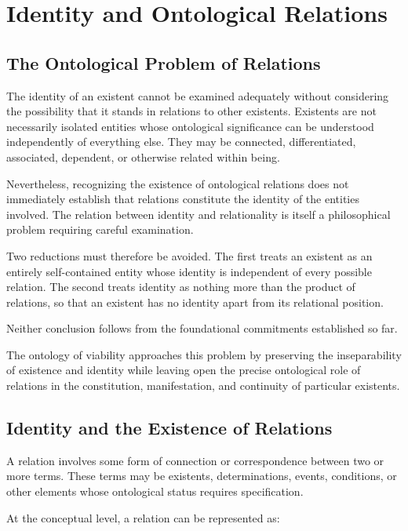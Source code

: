 
\section{Identity and Ontological Relations}
\label{sec:identity-and-ontological-relations}

\subsection{The Ontological Problem of Relations}

The identity of an existent cannot be examined adequately without considering the possibility that it stands in relations to other existents. Existents are not necessarily isolated entities whose ontological significance can be understood independently of everything else. They may be connected, differentiated, associated, dependent, or otherwise related within being.

Nevertheless, recognizing the existence of ontological relations does not immediately establish that relations constitute the identity of the entities involved. The relation between identity and relationality is itself a philosophical problem requiring careful examination.

Two reductions must therefore be avoided. The first treats an existent as an entirely self-contained entity whose identity is independent of every possible relation. The second treats identity as nothing more than the product of relations, so that an existent has no identity apart from its relational position.

Neither conclusion follows from the foundational commitments established so far.

The ontology of viability approaches this problem by preserving the inseparability of existence and identity while leaving open the precise ontological role of relations in the constitution, manifestation, and continuity of particular existents.

\subsection{Identity and the Existence of Relations}

A relation involves some form of connection or correspondence between two or more terms. These terms may be existents, determinations, events, conditions, or other elements whose ontological status requires specification.

At the conceptual level, a relation can be represented as:


